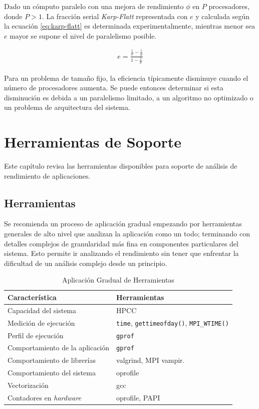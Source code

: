 \documentclass[a4paper]{report}
\begin{document}
\bigskip

Dado un c\'omputo paralelo con una mejora de rendimiento $ \phi $ en $ P $
procesadores, donde $ P > 1 $. La fracci\'on serial {\it Karp-Flatt}
representada con $ e $ y calculada seg\'un la ecuaci\'on \ref{eq:karp-flatt}
es determinada experimentalmente, mientras menor sea $ e $
mayor se supone el nivel de paralelismo posible.

\begin{eqnarray}
\label{eq:karp-flatt}
 e = \frac{\frac{1}{\psi} - \frac{1}{p}}{1 - \frac{1}{p}} 
\end{eqnarray}

Para un problema de tama\~no fijo, la eficiencia t\'ipicamente disminuye cuando
el n\'umero de procesadores aumenta. Se puede entonces determinar si esta disminuci\'on
es debida a un paralelismo limitado, a un algoritmo no optimizado o un problema de
arquitectura del sistema.

\chapter{Herramientas de Soporte}

Este cap\'itulo revisa las herramientas disponibles para soporte de an\'alisis
de rendimiento de aplicaciones.

\section{Herramientas}

Se recomienda un proceso de aplicaci\'on gradual empezando por herramientas generales de alto nivel que analizan la aplicaci\'on como un todo; terminando con detalles complejos de granularidad m\'as fina en componentes particulares del sistema. Esto permite ir analizando el rendimiento sin tener que enfrentar la dificultad de un an\'alisis complejo desde un principio.

\begin{table}[H]
\caption{Aplicaci\'on Gradual de Herramientas}
\begin{tabular}{|l|l|} \hline
{\bf Caracter\'istica} & {\bf Herramientas} \\ \hline
Capacidad del sistema & HPCC \\ \hline
Medici\'on de ejecuci\'on & {\tt time}, {\tt gettimeofday()}, {\tt MPI\_WTIME()} \\ \hline
Perfil de ejecuci\'on & {\tt gprof} \\ \hline
Comportamiento de la aplicaci\'on & {\tt gprof} \\ \hline
Comportamiento de librer\'ias & valgrind, MPI vampir. \\ \hline
Comportamiento del sistema & oprofile \\ \hline
Vectorizaci\'on & gcc \\ \hline
Contadores en {\it hardware} & oprofile, PAPI \\ \hline
\end{tabular}
\label{table:tools}
\end{table}
\end{document}
